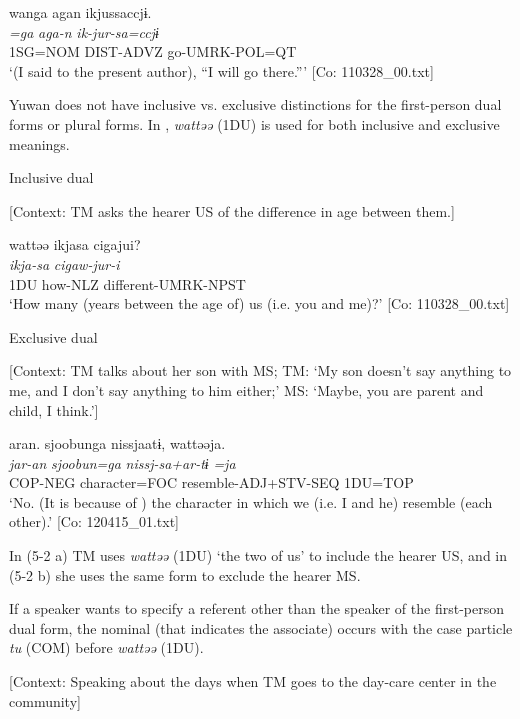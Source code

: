 \glll  wanga  agan  ikjussaccjɨ.\\
\textit{=ga}  \textit{aga-n}  \textit{ik-jur-sa=ccjɨ}\\
1SG=NOM  DIST-ADVZ  go-UMRK-POL=QT\\
\glt ‘(I said to the present author), “I will go there.”’ [Co: 110328\_00.txt]
\z

Yuwan does not have inclusive vs. exclusive distinctions for the first-person dual forms or plural forms. In , \textit{wattəə} (1DU) is used for both inclusive and exclusive meanings.

\ea \label{ex:5:3}  \ea \label{ex:5:3a} Inclusive dual

    [Context: TM asks the hearer US of the difference in age between them.]

\glll  wattəə  ikjasa  cigajui?\\
\textit{}  \textit{ikja-sa}  \textit{cigaw-jur-i}\\
1DU  how-NLZ  different-UMRK-NPST\\
\glt ‘How many (years between the age of) us (i.e. you and me)?’ [Co: 110328\_00.txt]

 \ex \label{ex:5:b} Exclusive dual

    [Context: TM talks about her son with MS; TM: ‘My son doesn’t say anything to me, and I don’t say anything to him either;’ MS: ‘Maybe, you are parent and child, I think.’]

\glll  aran.  sjoobunga  nissjaatɨ,  wattəəja.\\
\textit{jar-an}  \textit{sjoobun=ga}  \textit{nissj-sa+ar-tɨ}  \textit{=ja}\\
COP-NEG  character=FOC  resemble-ADJ+STV-SEQ  1DU=TOP\\
\glt ‘No. (It is because of ) the character in which we (i.e. I and he) resemble (each other).’ [Co: 120415\_01.txt]
\z
\z

In (5-2 a) TM uses \textit{wattəə} (1DU) ‘the two of us’ to include the hearer US, and in (5-2 b) she uses the same form to exclude the hearer MS.

If a speaker wants to specify a referent other than the speaker of the first-person dual form, the nominal (that indicates the associate) occurs with the case particle \textit{tu} (COM) before \textit{wattəə} (1DU).

\ea \label{ex:5:4}   [Context: Speaking about the days when TM goes to the day-care center in the community]

